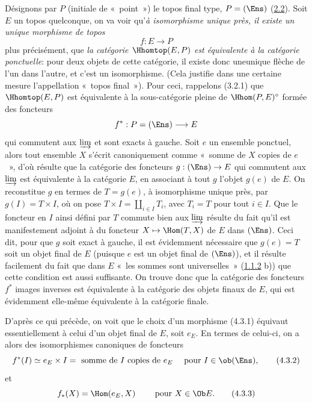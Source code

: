 \documentclass[10pt]{../fichiers-configuration-latex/smfart}
\begin{document}
Désignons par $P$ (initiale de « point ») le topos final type,
\ie $P=(\Ens)$ (\hyperref[IV.subsec2.2]{2.2}). Soit $E$ un topos quelconque,
on va voir qu'\emph{à isomorphisme unique près, il existe un
unique morphisme de topos}
$$
f:E\rightarrow P
$$
plus précisément, que \emph{la catégorie $\Hhomtop(E,P)$ est
équivalente à la catégorie ponctuelle}: pour deux objets de
cette catégorie, il existe donc une\pageoriginale unique flèche
de l'un dans l'autre, et c'est un isomorphisme. (Cela justifie dans
une certaine mesure l'appellation « topos final »). Pour ceci,
rappelons (3.2.1) que $\Hhomtop(E,P)$ est équivalente à la
sous-catégorie pleine de $\Hhom(P,E)^{\circ}$ formée des
foncteurs
$$
f^{\ast}:P=(\Ens)\longrightarrow E
$$
qui commutent aux $\varinjlim$ et sont exacts à gauche. Soit $e$ un
ensemble ponctuel, alors tout ensemble $X$ s'écrit canoniquement
comme « somme de $X$ copies de $e$ », d'où résulte que la
catégorie des foncteurs $g:(\Ens)\rightarrow E$ qui commutent aux
$\varinjlim$ est équivalente à la catégorie $E$, en associant à tout
$g$ l'objet $g(e)$ de $E$. On reconstitue $g$ en termes de $T=g(e)$,
à isomorphisme unique près, par $g(I)=T\times I$, où on pose
$T\times I=\amalg_{i\in I}T_i$, avec $T_i=T$ pour tout $i\in I$. Que
le foncteur en $I$ ainsi défini par $T$ commute bien aux
$\varinjlim$ résulte du fait qu'il est manifestement adjoint à
 du foncteur $X\mapsto \Hom(T,X)$ de $E$ dans $(\Ens)$. Ceci
dit, pour que $g$ soit exact à gauche, il est évidemment nécessaire
que $g(e)=T$ soit un objet final de $E$ (puisque $e$ est un objet
final de $(\Ens)$), et il résulte facilement du fait que dans $E$
« les sommes sont universelles »  (\hyperref[IV.subsubsec1.1.2]{1.1.2} b))
que cette condition est aussi suffisante. On trouve donc que la
catégorie des foncteurs $f^{\ast}$ images inverses est équivalente à
la catégorie des objets finaux de $E$, qui est évidemment elle-même
équivalente à la catégorie finale.

D'après ce qui précède, on voit que le choix d'un morphisme
(4.3.1) équivaut essentiellement à celui d'un objet final de
$E$, soit $e_E$. En termes de celui-ci, on a alors des isomorphismes
canoniques de foncteurs
\begin{equation*}
 f^{\ast}(I)\simeq e_E\times
I=\mbox{ somme de } I \mbox{ copies de } e_E \quad \mbox{ pour } I\in \ob
(\Ens),\tag{4.3.2}
\end{equation*}
et\pageoriginale
\begin{equation*}
f_{\ast}(X)=\Hom(e_E,X) \quad \quad \mbox{ pour } X\in \Ob E.\tag{4.3.3}
\end{equation*}
\end{document}
